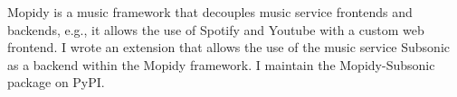 {
  Mopidy is a music framework that decouples music service frontends and backends, e.g., it allows the use of Spotify and Youtube with a custom web frontend. I wrote an extension that allows the use of the music service Subsonic as a backend within the Mopidy framework. I maintain the Mopidy-Subsonic package on PyPI.
}
